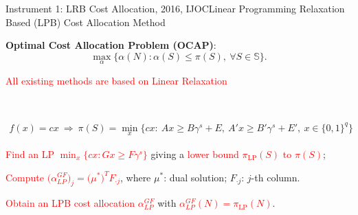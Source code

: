 \documentclass[14pt]{beamer}
\begin{document}
\begin{frame}{Instrument 1: LRB Cost Allocation, {\footnotesize 2016, IJOC}}{Linear Programming Relaxation Based (LPB) Cost Allocation Method}
\vspace{-5mm}
\small
\begin{shaded}
\centering
{\bf Optimal Cost Allocation Problem (OCAP)}:
\begin{equation*}
\max_{\alpha}\big\{ \alpha(N):\alpha(S) \leq \pi(S), ~\forall S \in \mathbb{S} \big\}.
\end{equation*}
\vspace{-2em}
\end{shaded}

\textcolor{red}{\bf \centerline{All existing methods are based on Linear Relaxation}}\\
\vspace{-3mm}
\begin{shaded}
\vspace{-6mm}
\footnotesize
\begin{eqnarray*}
f(x) = cx ~\Longrightarrow~ \pi(S) = \min_{x} \big\{ cx:~Ax \geq B\gamma^s + E, ~A'x \geq B'\gamma^s + E', ~x \in \{0,1\}^{q} \big\}
\end{eqnarray*}
\vspace{-8mm}
\end{shaded}
\vspace{-5mm}
\begin{description}
\justifying
\footnotesize
	\item[Step 1.] \textcolor{red}{Find an LP $\min_x \big\{cx:Gx \geq F\gamma^s\big\}$} giving a \textcolor{red}{lower bound $\pi_{\mathrm{LP}}(S)$ to $\pi(S)$};
	\item[Step 2.] \textcolor{red}{Compute $\big(\alpha^{GF}_{LP}\big)_j = \big(\mu^*\big)^T F_{\cdot j}$}, where $\mu^*$: dual solution; $F_{\cdot j}$: $j$-th column.
	\item[Step 3.] \textcolor{red}{Obtain an LPB cost allocation $\alpha^{GF}_{LP}$} with \textcolor{red}{$\alpha^{GF}_{LP}(N) = \pi_{\mathrm{LP}}(N)$}.
\end{description}




\end{frame}
\end{document}
